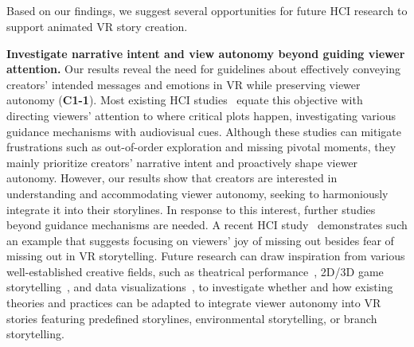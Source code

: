 \subsection{}
\label{sec:opportunities}

Based on our findings, we suggest several opportunities for future HCI research to support animated VR story creation. 

\textbf{Investigate narrative intent and view autonomy beyond guiding viewer attention.}
Our results reveal the need for guidelines about effectively conveying creators' intended messages and emotions in VR while preserving viewer autonomy (\textbf{C1-1}). Most existing HCI studies~\cite{rothe2019guidance, schmitz2020directing} equate this objective with directing viewers' attention to where critical plots happen, investigating various guidance mechanisms with audiovisual cues. Although these studies can mitigate frustrations such as out-of-order exploration and missing pivotal moments, they mainly prioritize creators’ narrative intent and proactively shape viewer autonomy. However, our results show that creators are interested in understanding and accommodating viewer autonomy, seeking to harmoniously integrate it into their storylines. In response to this interest, further studies beyond guidance mechanisms are needed. 
A recent HCI study~\cite{aitamurto2021fomo} demonstrates such an example that suggests focusing on viewers’ joy of missing out besides fear of missing out in VR storytelling. 
Future research can draw inspiration from various well-established creative fields, such as theatrical performance~\cite{pope2017geometry, gupta2020roleplaying}, 2D/3D game storytelling~\cite{poretski2022gameLearn}, and data visualizations~\cite{li2023geocamera}, to investigate whether and how existing theories and practices can be adapted to integrate viewer autonomy into VR stories featuring predefined storylines, environmental storytelling, or branch storytelling.

